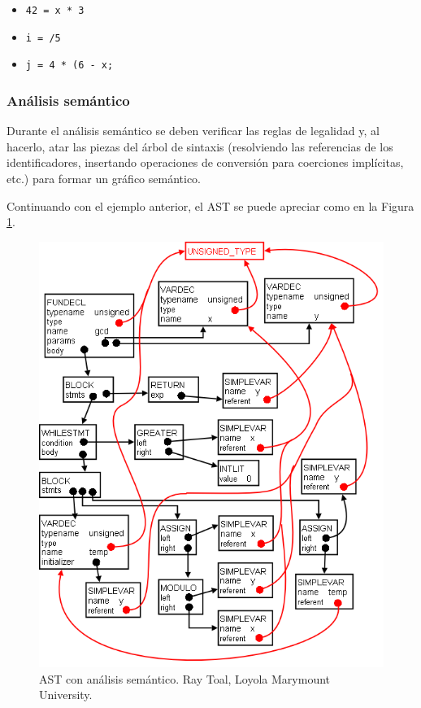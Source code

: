 \begin{itemize}
    \item \texttt{42 = x * 3}
    \item \texttt{i = /5}
    \item \texttt{j = 4 * (6 - x;}
\end{itemize}


\subsubsection{Análisis semántico}
Durante el análisis semántico se deben verificar las reglas de legalidad y, al hacerlo, atar las piezas del árbol de sintaxis (resolviendo las referencias de los identificadores, insertando operaciones de conversión para coerciones implícitas, etc.) para formar un gráfico semántico.

Continuando con el ejemplo anterior, el AST se puede apreciar como en la Figura \ref{fig:ast semantic}.

\begin{figure}[h]
    \centering
    \includegraphics[scale=0.3]{images/gcdsemgraph.png}
    \caption{AST con análisis semántico. Ray Toal, Loyola Marymount University.}
    \label{fig:ast semantic}
\end{figure}

